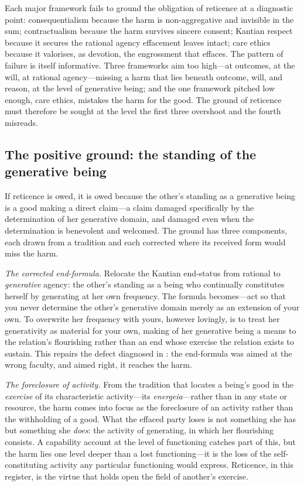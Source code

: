 \begin{claim}
Each major framework fails to ground the obligation of reticence at a diagnostic point: consequentialism because the harm is non-aggregative and invisible in the sum; contractualism because the harm survives sincere consent; Kantian respect because it secures the rational agency effacement leaves intact; care ethics because it valorises, as devotion, the engrossment that effaces. The pattern of failure is itself informative. Three frameworks aim too high---at outcomes, at the will, at rational agency---missing a harm that lies beneath outcome, will, and reason, at the level of generative being; and the one framework pitched low enough, care ethics, mistakes the harm for the good. The ground of reticence must therefore be sought at the level the first three overshoot and the fourth misreads.
\end{claim}

\subsection{The positive ground: the standing of the generative being}
\label{p18:sub:eth-ground}

If reticence is owed, it is owed because the other's standing as a generative being is a good making a direct claim---a claim damaged specifically by the determination of her generative domain, and damaged even when the determination is benevolent and welcomed. The ground has three components, each drawn from a tradition and each corrected where its received form would miss the harm.

\emph{The corrected end-formula.} Relocate the Kantian end-status from rational to \emph{generative} agency: the other's standing as a being who continually constitutes herself by generating at her own frequency. The formula becomes---act so that you never determine the other's generative domain merely as an extension of your own. To overwrite her frequency with yours, however lovingly, is to treat her generativity as material for your own, making of her generative being a means to the relation's flourishing rather than an end whose exercise the relation exists to sustain. This repairs the defect diagnosed in : the end-formula was aimed at the wrong faculty, and aimed right, it reaches the harm.

\emph{The foreclosure of activity.} From the tradition that locates a being's good in the \emph{exercise} of its characteristic activity---its \emph{energeia}---rather than in any state or resource, the harm comes into focus as the foreclosure of an activity rather than the withholding of a good. What the effaced party loses is not something she has but something she \emph{does}: the activity of generating, in which her flourishing consists. A capability account at the level of functioning catches part of this, but the harm lies one level deeper than a lost functioning---it is the loss of the self-constituting activity any particular functioning would express. Reticence, in this register, is the virtue that holds open the field of another's exercise.

